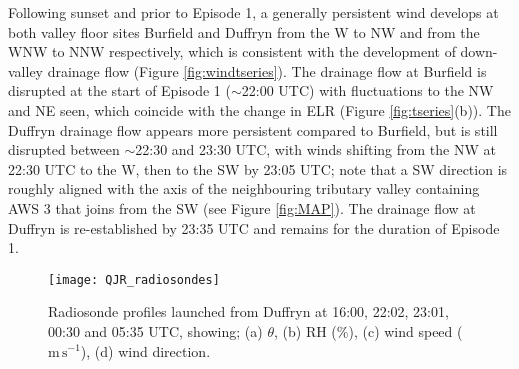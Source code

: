 \documentclass[times]{qjrms4}
\begin{document}
Following sunset and prior to Episode 1, a generally persistent wind develops at both valley floor sites Burfield and Duffryn from the W to NW and from the WNW to NNW respectively, which is consistent with the development of down-valley drainage flow (Figure \ref{fig:windtseries}). The drainage flow at Burfield is disrupted at the start of Episode 1 ($\sim$22:00 UTC) with fluctuations to the NW and NE seen, which coincide with the change in ELR (Figure \ref{fig:tseries}(b)). The Duffryn drainage flow appears more persistent compared to Burfield, but is still disrupted between $\sim$22:30 and 23:30 UTC, with winds shifting from the NW at 22:30 UTC to the W, then to the SW by 23:05 UTC; note that a SW direction is roughly aligned with the axis of the neighbouring tributary valley containing AWS 3 that joins from the SW (see Figure \ref{fig:MAP}). The drainage flow at Duffryn is re-established by 23:35 UTC and remains for the duration of Episode 1.
%
       \begin{figure*}
        \centering
        \texttt{[image: QJR\_radiosondes]}
        \caption{Radiosonde profiles launched from Duffryn at 16:00, 22:02, 23:01, 00:30 and 05:35 UTC, showing; (a) $\theta$, (b) RH (\%), (c) wind speed ($\mbox{m}\,\mbox{s}^{-1}$), (d) wind direction.}
        \label{fig:radiosondes}
        \end{figure*}
\end{document}
